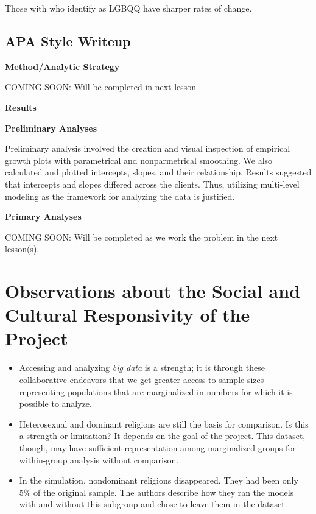 \documentclass[
  11pt,
]{book}
\providecommand{\tightlist}{%
  \setlength{\itemsep}{0pt}\setlength{\parskip}{0pt}}
\begin{document}
Those with who identify as LGBQQ have sharper rates of change.

\hypertarget{apa-style-writeup-1}{%
\subsection{APA Style Writeup}\label{apa-style-writeup-1}}

\textbf{Method/Analytic Strategy}

COMING SOON: Will be completed in next lesson

\textbf{Results}

\textbf{Preliminary Analyses}

Preliminary analysis involved the creation and visual inspection of empirical growth plots with parametrical and nonparmetrical smoothing. We also calculated and plotted intercepts, slopes, and their relationship. Results suggested that intercepts and slopes differed across the clients. Thus, utilizing multi-level modeling as the framework for analyzing the data is justified.

\textbf{Primary Analyses}

COMING SOON: Will be completed as we work the problem in the next lesson(s).

\hypertarget{observations-about-the-social-and-cultural-responsivity-of-the-project}{%
\section{Observations about the Social and Cultural Responsivity of the Project}\label{observations-about-the-social-and-cultural-responsivity-of-the-project}}

\begin{itemize}
\tightlist
\item
  Accessing and analyzing \emph{big data} is a strength; it is through these collaborative endeavors that we get greater access to sample sizes representing populations that are marginalized in numbers for which it is possible to analyze.
\item
  Heterosexual and dominant religions are still the basis for comparison. Is this a strength or limitation? It depends on the goal of the project. This dataset, though, may have sufficient representation among marginalized groups for within-group analysis without comparison.
\item
  In the simulation, nondominant religions disappeared. They had been only 5\% of the original sample. The authors describe how they ran the models with and without this subgroup and chose to leave them in the dataset.
\end{itemize}
\end{document}
